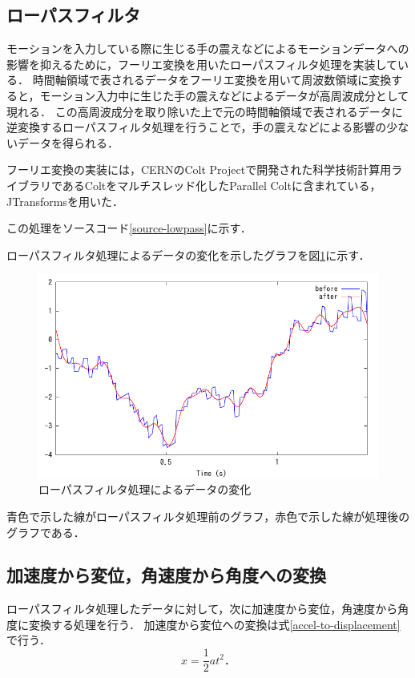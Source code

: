 \subsection{ローパスフィルタ}
モーションを入力している際に生じる手の震えなどによるモーションデータへの影響を抑えるために，フーリエ変換を用いたローパスフィルタ処理を実装している．
時間軸領域で表されるデータをフーリエ変換を用いて周波数領域に変換すると，モーション入力中に生じた手の震えなどによるデータが高周波成分として現れる．
この高周波成分を取り除いた上で元の時間軸領域で表されるデータに逆変換するローパスフィルタ処理を行うことで，手の震えなどによる影響の少ないデータを得られる．

フーリエ変換の実装には，CERNのColt Project\cite{4-colt-project}で開発された科学技術計算用ライブラリであるColtをマルチスレッド化したParallel Colt\cite{4-parallel-colt}に含まれている，JTransforms\cite{4-jtransforms}を用いた．

この処理をソースコード\ref{source-lowpass}に示す．



ローパスフィルタ処理によるデータの変化を示したグラフを図\ref{graph-lowpass}に示す．

\begin{figure}[hbtp]
  \centering
  \includegraphics[bb=0 0 360 216, width=12cm]{Graphs/lowpass.pdf}
  \caption{ローパスフィルタ処理によるデータの変化}
  \label{graph-lowpass}
\end{figure}

青色で示した線がローパスフィルタ処理前のグラフ，赤色で示した線が処理後のグラフである．

\subsection{加速度から変位，角速度から角度への変換}
ローパスフィルタ処理したデータに対して，次に加速度から変位，角速度から角度に変換する処理を行う．
加速度から変位への変換は式\ref{accel-to-displacement}で行う．
\begin{equation}
\label{accel-to-displacement}
x = \frac{1}{2} a t^2．
\end{equation}

